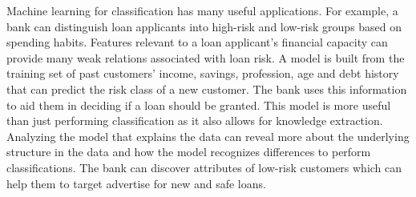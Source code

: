 Machine learning for classification has many useful applications.
For example, a bank can distinguish loan applicants into high-risk and low-risk groups based on spending habits.
Features relevant to a loan applicant's financial capacity can provide many weak relations associated with loan risk\citep{alpaydin2004introduction}.
A model is built from the training set of past customers' income, savings, profession, age and debt history that can predict the risk class of a new customer.
The bank uses this information to aid them in deciding if a loan should be granted.
This model is more useful than just performing classification as it also allows for knowledge extraction.
Analyzing the model that explains the data can reveal more about the underlying structure in the data and how the model recognizes differences to perform classifications.
The bank can discover attributes of low-risk customers which can help them to target advertise for new and safe loans.






